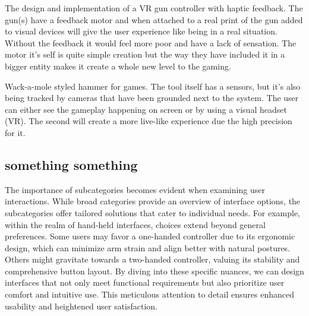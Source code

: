 The design and implementation of a VR gun controller with haptic feedback. The gun(s) have a feedback motor and when attached to a real print of the gun added to visual devices will give the user experience like being in a real situation. Without the feedback it would feel more poor and have a lack of sensation. The motor it's self is quite simple creation but the way they have included it in a bigger entity makes it create a whole new level to the gaming.

Wack-a-mole styled hammer for games. The tool itself has a sensors, but it's also being tracked by cameras that have been grounded next to the system. The user can either see the gameplay happening on screen or by using a visual headset (VR). The second will create a more live-like experience due the high precision for it.

\subsection{something something}

The importance of subcategories becomes evident when examining user interactions. While broad categories provide an overview of interface options, the subcategories offer tailored solutions that cater to individual needs. For example, within the realm of hand-held interfaces, choices extend beyond general preferences. Some users may favor a one-handed controller due to its ergonomic design, which can minimize arm strain and align better with natural postures. Others might gravitate towards a two-handed controller, valuing its stability and comprehensive button layout. By diving into these specific nuances, we can design interfaces that not only meet functional requirements but also prioritize user comfort and intuitive use. This meticulous attention to detail ensures enhanced usability and heightened user satisfaction.